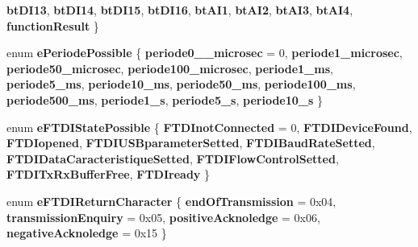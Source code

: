 \begin{DoxyCompactItemize}
{\bfseries bt\+D\+I13}, 
{\bfseries bt\+D\+I14}, 
{\bfseries bt\+D\+I15}, 
\newline
{\bfseries bt\+D\+I16}, 
{\bfseries bt\+A\+I1}, 
{\bfseries bt\+A\+I2}, 
{\bfseries bt\+A\+I3}, 
\newline
{\bfseries bt\+A\+I4}, 
{\bfseries function\+Result}
 \}
\item 
\mbox{\label{class_global_enumated_and_extern_abc49ace8b35e4dbcb0d386ef2345b2ea}} 
enum {\bfseries e\+Periode\+Possible} \{ \newline
{\bfseries periode0\+\_\+\_\+microsec} = 0, 
{\bfseries periode1\+\_\+microsec}, 
{\bfseries periode50\+\_\+microsec}, 
{\bfseries periode100\+\_\+microsec}, 
\newline
{\bfseries periode1\+\_\+ms}, 
{\bfseries periode5\+\_\+ms}, 
{\bfseries periode10\+\_\+ms}, 
{\bfseries periode50\+\_\+ms}, 
\newline
{\bfseries periode100\+\_\+ms}, 
{\bfseries periode500\+\_\+ms}, 
{\bfseries periode1\+\_\+s}, 
{\bfseries periode5\+\_\+s}, 
\newline
{\bfseries periode10\+\_\+s}
 \}
\item 
\mbox{\label{class_global_enumated_and_extern_a90ce2f72845e86ab24d740dade100a97}} 
enum {\bfseries e\+F\+T\+D\+I\+State\+Possible} \{ \newline
{\bfseries F\+T\+D\+Inot\+Connected} = 0, 
{\bfseries F\+T\+D\+I\+Device\+Found}, 
{\bfseries F\+T\+D\+Iopened}, 
{\bfseries F\+T\+D\+I\+U\+S\+Bparameter\+Setted}, 
\newline
{\bfseries F\+T\+D\+I\+Baud\+Rate\+Setted}, 
{\bfseries F\+T\+D\+I\+Data\+Caracteristique\+Setted}, 
{\bfseries F\+T\+D\+I\+Flow\+Control\+Setted}, 
{\bfseries F\+T\+D\+I\+Tx\+Rx\+Buffer\+Free}, 
\newline
{\bfseries F\+T\+D\+Iready}
 \}
\item 
\mbox{\label{class_global_enumated_and_extern_a9c17d244982cc8a07ab7ac6adf9f1666}} 
enum {\bfseries e\+F\+T\+D\+I\+Return\+Character} \{ {\bfseries end\+Of\+Transmission} = 0x04, 
{\bfseries transmission\+Enquiry} = 0x05, 
{\bfseries positive\+Acknoledge} = 0x06, 
{\bfseries negative\+Acknoledge} = 0x15
 \}
\end{DoxyCompactItemize}
